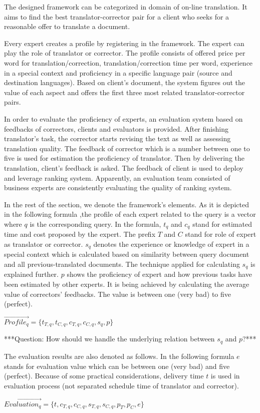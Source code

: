 The designed framework can be categorized in domain of on-line translation. It aims to find the best translator-corrector pair for a client who seeks for a reasonable offer to translate a document.

Every expert creates a profile by registering in the framework. The expert can play the role of translator or corrector. The profile consists of offered price per word for translation/correction, translation/correction time per word, experience in a special context and proficiency in a specific language pair (source and destination languages). Based on client's document, the system figures out the value of each aspect and offers the first three most related translator-corrector pairs.

In order to evaluate the proficiency of experts, an evaluation system based on feedbacks of correctors, clients and evaluators is provided. After finishing translator's task, the corrector starts revising the text as well as assessing translation quality. The feedback of corrector which is a number between one to five is used for estimation the proficiency of translator. Then by delivering the translation, client's feedback is asked. The feedback of client is used to deploy and leverage ranking system. Apparently, an evaluation team consisted of business experts are consistently evaluating the quality of ranking system.

In the rest of the section, we denote the framework's elements. As it is depicted in the following formula ,the profile of each expert related to the query is a vector where $q$ is the corresponding query. In the formula, $t_q$ and $c_q$ stand for estimated time and cost proposed by the expert. The prefix $T$ and $C$ stand for role of expert as translator or corrector. $s_q$ denotes the experience or knowledge of expert in a special context which is calculated based on similarity between query document and all previous-translated documents. The technique applied for calculating $s_q$ is explained further. $p$ shows the proficiency of expert and how previous tasks have been estimated by other experts. It is being achieved by calculating the average value of correctors' feedbacks. The value is between one (very bad) to five (perfect).

\begin{center}
$\overrightarrow{Profile_{q}} = \{ t_{T,q}, t_{C,q}, c_{T,q}, c_{C,q}, s_q, p \}$ \\
\end{center}

***Question: How should we handle the underlying relation between $s_q$ and $p$?***

The evaluation results are also denoted as follows. In the following formula $e$ stands for evaluation value which can be between one (very bad) and five (perfect). Because of some practical considerations, delivery time $t$ is used in evaluation process (not separated schedule time of translator and corrector).

\begin{center}
$\overrightarrow{Evaluation_{q}} = \{ t, c_{T,q}, c_{C,q}, s_{T,q}, s_{C,q}, p_T, p_C, e \}$ \\
\end{center}
